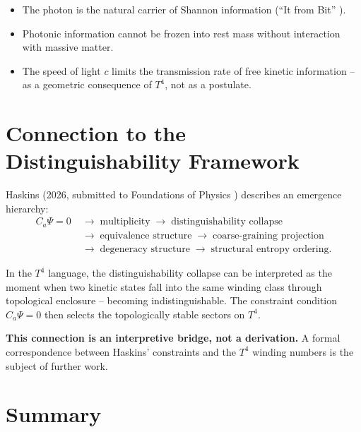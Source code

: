 \begin{itemize}
  \item The photon is the natural carrier of Shannon information
        (\enquote{It from Bit} \cite{Wheeler1990}).
  \item Photonic information cannot be frozen into rest mass
        without interaction with massive matter.
  \item The speed of light \(c\) limits the transmission rate
        of free kinetic information -- as a geometric consequence
        of \(T^4\), not as a postulate.
\end{itemize}

\section{Connection to the Distinguishability Framework}

Haskins (2026, submitted to Foundations of Physics \cite{Haskins2026})
describes an emergence hierarchy:
\begin{align*}
C_a\Psi = 0 \;&\to\; \text{multiplicity} \;\to\;
\text{distinguishability collapse} \\
&\to\; \text{equivalence structure} \;\to\;
\text{coarse-graining projection} \\
&\to\; \text{degeneracy structure} \;\to\;
\text{structural entropy ordering.}
\end{align*}

In the \(T^4\) language, the distinguishability collapse can be
interpreted as the moment when two kinetic states fall into the
same winding class through topological enclosure -- becoming
indistinguishable. The constraint condition \(C_a\Psi = 0\) then
selects the topologically stable sectors on \(T^4\).

\textbf{This connection is an interpretive bridge, not a derivation.}
A formal correspondence between Haskins' constraints and the
\(T^4\) winding numbers is the subject of further work.

\section{Summary}

